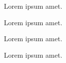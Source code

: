 \documentclass{article}
\begin{document}
Lorem ipsum  amet.

Lorem ipsum  amet.

Lorem ipsum  amet.

Lorem ipsum  amet.
\end{document}
